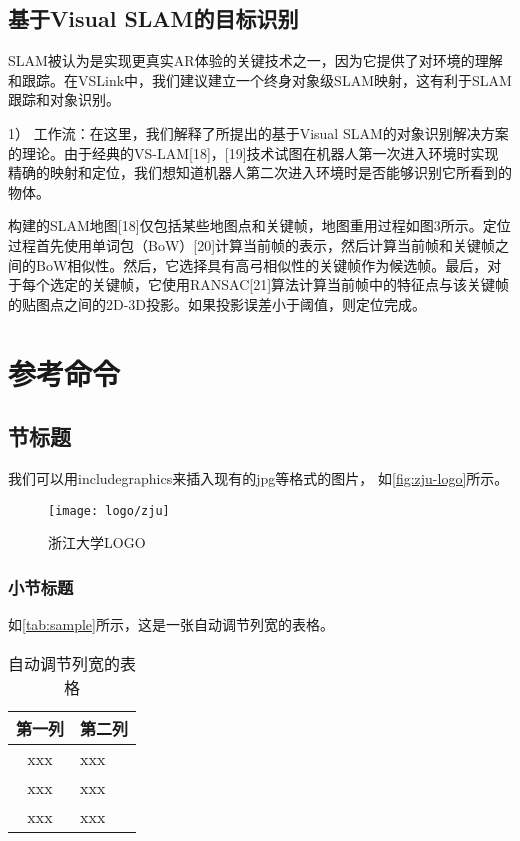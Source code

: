 \section{基于Visual SLAM的目标识别}
SLAM被认为是实现更真实AR体验的关键技术之一，因为它提供了对环境的理解和跟踪。在VSLink中，我们建议建立一个终身对象级SLAM映射，这有利于SLAM跟踪和对象识别。

1） 工作流：在这里，我们解释了所提出的基于Visual SLAM的对象识别解决方案的理论。由于经典的VS-LAM[18]，[19]技术试图在机器人第一次进入环境时实现精确的映射和定位，我们想知道机器人第二次进入环境时是否能够识别它所看到的物体。

构建的SLAM地图[18]仅包括某些地图点和关键帧，地图重用过程如图3所示。定位过程首先使用单词包（BoW）[20]计算当前帧的表示，然后计算当前帧和关键帧之间的BoW相似性。然后，它选择具有高弓相似性的关键帧作为候选帧。最后，对于每个选定的关键帧，它使用RANSAC[21]算法计算当前帧中的特征点与该关键帧的贴图点之间的2D-3D投影。如果投影误差小于阈值，则定位完成。


\chapter{参考命令}
\section{节标题}

我们可以用includegraphics来插入现有的jpg等格式的图片，
如\autoref{fig:zju-logo}所示。

\begin{figure}[htbp]
    \centering
    \texttt{[image: logo/zju]}
    \caption{\label{fig:zju-logo}浙江大学LOGO}
\end{figure}


\subsection{小节标题}


\par 如\autoref{tab:sample}所示，这是一张自动调节列宽的表格。

\begin{table}[htbp]
    \caption{\label{tab:sample}自动调节列宽的表格}
    \begin{tabularx}{\linewidth}{c|X<{\centering}}
        \hline
        第一列 & 第二列 \\ \hline
        xxx & xxx \\ \hline
        xxx & xxx \\ \hline
        xxx & xxx \\ \hline
    \end{tabularx}
\end{table}


